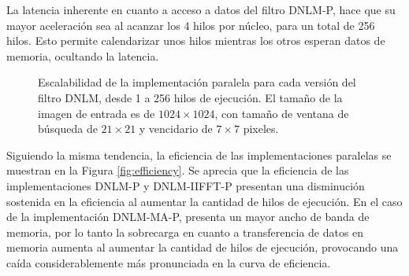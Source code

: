 La latencia inherente en cuanto a acceso a datos del filtro DNLM-P, hace que su mayor aceleraci\'on sea al acanzar los 4 hilos por n\'ucleo, para un total de 256 hilos. Esto permite calendarizar unos hilos mientras los otros esperan datos de memoria, ocultando la latencia.  





\begin{figure}
\centering
  \caption[Escalabilidad de las implementaciones paralelas del filtro DNLM]{Escalabilidad de la implementación paralela para cada versión del filtro DNLM, desde 1 a 256 hilos de ejecución. El tama\~no de la imagen de entrada es de $1024\times1024$, con tama\~no de ventana de búsqueda de $21 \times 21$ y vencidario de $7 \times 7$ pixeles.\label{fig:scalability}}
  \end{figure}
 
  
  Siguiendo la misma tendencia, la eficiencia de las implementaciones paralelas se muestran en la Figura \ref{fig:efficiency}. Se aprecia que la eficiencia de las implementaciones DNLM-P y DNLM-IIFFT-P presentan una disminución sostenida en la eficiencia al aumentar la cantidad de hilos de ejecución. En el caso de la implementación DNLM-MA-P, presenta un mayor ancho de banda de memoria, por lo tanto la sobrecarga en cuanto a transferencia de datos en memoria aumenta al aumentar la cantidad de hilos de ejecución, provocando una caída considerablemente más pronunciada en la curva de eficiencia.
  

